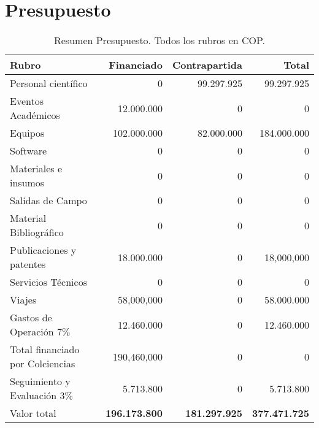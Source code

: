 
\section{Presupuesto}




\begin{table}[h]
\begin{center}
\begin{tabular}{|l|r|r|r|}\hline
\textbf{Rubro} 	& {\bf Financiado} & {\bf Contrapartida} & {\bf Total}\\\hline 
Personal científico	&0	&99.297.925	&99.297.925\\\hline
Eventos Académicos	&12.000.000	& 0	& 0\\\hline
Equipos	& 102.000.000 &	82.000.000 &	184.000.000\\\hline
Software&	0	&0	&0\\\hline
Materiales e insumos	&0	&0	&0\\\hline
Salidas de Campo	&0	&0	&0\\\hline
Material Bibliogr\'afico	&0	&0	&0 \\\hline
Publicaciones y patentes&	18.000.000	&0	&18,000,000\\\hline
Servicios Técnicos	&0	&0	&0\\\hline
Viajes	& 58,000,000	& 0	&58.000.000\\\hline
Gastos de Operación $7\%$&	12.460.000	&0	&12.460.000\\\hline
Total financiado por Colciencias&	190,460,000	&0	&0\\\hline
Seguimiento y Evaluación $3\%$&	 5.713.800	&0	&5.713.800\\\hline
Valor total&	{\bf 196.173.800}	& {\bf 181.297.925}	&{\bf 377.471.725}\\\hline
\end{tabular} 
\caption{Resumen Presupuesto. Todos los rubros en COP.}
\end{center}
\label{Resumen Presupuesto}
\end{table}


